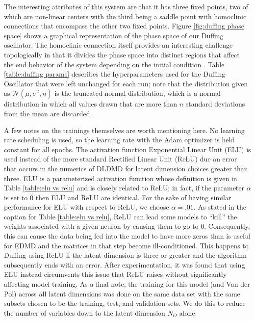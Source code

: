 The interesting attributes of this system are that it has three fixed points, two of which are non-linear 
centers with the third being a saddle point with homoclinic connections that encompass the other two fixed 
points. Figure \ref{fig:duffing phase space} shows a graphical representation of the phase space of our 
Duffing oscillator. The homoclinic connection itself provides an interesting challenge topologically in 
that it divides the phase space into distinct regions that affect the end behavior of the system depending
on the initial condition \cite{strogatz:2000}. Table \ref{table:duffing params} describes the hyperparameters 
used for the 
Duffing Oscillator that were left unchanged for each run; note that the distribution given as 
$\mathcal{N}(\mu, \sigma^2, n)$ is the truncated normal distribution, which is a normal distribution
in which all values drawn that are more than $n$ standard deviations from the mean are discarded. 

A few notes on the trainings themselves are worth mentioning here. No learning rate scheduling is used,
so the learning rate with the Adam optimizer is held constant for all epochs. The activation function
Exponential Linear Unit (ELU) is used instead of the more standard Rectified Linear Unit (ReLU) due an 
error that occurs in the numerics of DLDMD for latent dimension choices greater than three. ELU is a 
parameterized activation function whose definition is given in Table \ref{table:elu vs relu} and is closely
related to ReLU; in fact, if the parameter $\alpha$ is set to 0 then ELU and ReLU are identical. For the
sake of having similar performance for ELU with respect to ReLU, we choose $\alpha = .01$.
As stated in the caption for Table \ref{table:elu vs relu}, ReLU can lead some models to ``kill'' the 
weights associated with a given neuron by causing them to go to 0. Consequently, this can cause the 
data being fed into the model to have more zeros than is useful for EDMD and the matrices in that step 
become ill-conditioned. This happens to Duffing using ReLU if the 
latent dimension is three or greater and the algorithm subsequently ends with an error. After experimentation, 
it was found that using ELU instead circumvents this issue that ReLU raises without significantly affecting 
model training. As a final note, the training for this model (and Van der Pol) across all latent dimensions 
was done on the 
same data set with the same subsets chosen to be the training, test, and validation sets. We do this to
reduce the number of variables down to the latent dimension $N_O$ alone.

